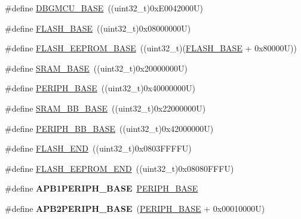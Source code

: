 \begin{DoxyCompactItemize}
\item 
\#define \hyperlink{group___peripheral__memory__map_ga4adaf4fd82ccc3a538f1f27a70cdbbef}{D\-B\-G\-M\-C\-U\-\_\-\-B\-A\-S\-E}~((uint32\-\_\-t)0x\-E0042000\-U)
\item 
\#define \hyperlink{group___peripheral__memory__map_ga23a9099a5f8fc9c6e253c0eecb2be8db}{F\-L\-A\-S\-H\-\_\-\-B\-A\-S\-E}~((uint32\-\_\-t)0x08000000\-U)
\item 
\#define \hyperlink{group___peripheral__memory__map_ga45b9071c81cb72a66e2e3195343fcb3a}{F\-L\-A\-S\-H\-\_\-\-E\-E\-P\-R\-O\-M\-\_\-\-B\-A\-S\-E}~((uint32\-\_\-t)(\hyperlink{group___peripheral__memory__map_ga23a9099a5f8fc9c6e253c0eecb2be8db}{F\-L\-A\-S\-H\-\_\-\-B\-A\-S\-E} + 0x80000\-U))
\item 
\#define \hyperlink{group___peripheral__memory__map_ga05e8f3d2e5868754a7cd88614955aecc}{S\-R\-A\-M\-\_\-\-B\-A\-S\-E}~((uint32\-\_\-t)0x20000000\-U)
\item 
\#define \hyperlink{group___peripheral__memory__map_ga9171f49478fa86d932f89e78e73b88b0}{P\-E\-R\-I\-P\-H\-\_\-\-B\-A\-S\-E}~((uint32\-\_\-t)0x40000000\-U)
\item 
\#define \hyperlink{group___peripheral__memory__map_gad3548b6e2f017f39d399358f3ac98454}{S\-R\-A\-M\-\_\-\-B\-B\-\_\-\-B\-A\-S\-E}~((uint32\-\_\-t)0x22000000\-U)
\item 
\#define \hyperlink{group___peripheral__memory__map_gaed7efc100877000845c236ccdc9e144a}{P\-E\-R\-I\-P\-H\-\_\-\-B\-B\-\_\-\-B\-A\-S\-E}~((uint32\-\_\-t)0x42000000\-U)
\item 
\#define \hyperlink{group___peripheral__memory__map_ga8be554f354e5aa65370f6db63d4f3ee4}{F\-L\-A\-S\-H\-\_\-\-E\-N\-D}~((uint32\-\_\-t)0x0803\-F\-F\-F\-F\-U)
\item 
\#define \hyperlink{group___peripheral__memory__map_gac8cb9b66893a7c4bdff3258909af027a}{F\-L\-A\-S\-H\-\_\-\-E\-E\-P\-R\-O\-M\-\_\-\-E\-N\-D}~((uint32\-\_\-t)0x08080\-F\-F\-F\-U)
\item 
\hypertarget{group___peripheral__memory__map_ga45666d911f39addd4c8c0a0ac3388cfb}{\#define {\bfseries A\-P\-B1\-P\-E\-R\-I\-P\-H\-\_\-\-B\-A\-S\-E}~\hyperlink{group___peripheral__memory__map_ga9171f49478fa86d932f89e78e73b88b0}{P\-E\-R\-I\-P\-H\-\_\-\-B\-A\-S\-E}}\label{group___peripheral__memory__map_ga45666d911f39addd4c8c0a0ac3388cfb}

\item 
\hypertarget{group___peripheral__memory__map_ga25b99d6065f1c8f751e78f43ade652cb}{\#define {\bfseries A\-P\-B2\-P\-E\-R\-I\-P\-H\-\_\-\-B\-A\-S\-E}~(\hyperlink{group___peripheral__memory__map_ga9171f49478fa86d932f89e78e73b88b0}{P\-E\-R\-I\-P\-H\-\_\-\-B\-A\-S\-E} + 0x00010000\-U)}\label{group___peripheral__memory__map_ga25b99d6065f1c8f751e78f43ade652cb}


\end{DoxyCompactItemize}
